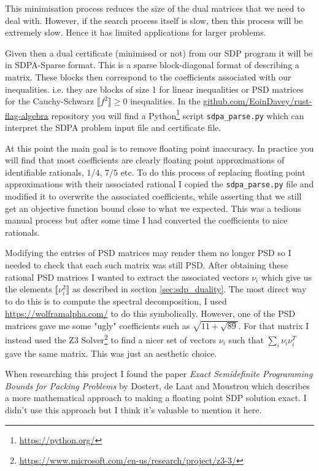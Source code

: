 This minimisation process reduces the size of the dual matrices that we need to deal with.
However, if the search process itself is slow, then this process will be extremely slow.
Hence it has limited applications for larger problems.

Given then a dual certificate (minimised or not) from our SDP program it will be in
SDPA-Sparse format. This is a sparse block-diagonal format of describing a matrix.
These blocks then correspond to the coefficients associated with our inequalities. i.e.
they are blocks of size 1 for linear inequalities or PSD matrices for the Cauchy-Schwarz
$\llbracket f^2 \rrbracket \geq 0$ inequalities. In the
\url{github.com/EoinDavey/rust-flag-algebra} repository you will find a
Python\footnote{\url{https://python.org/}} script \verb|sdpa_parse.py| which can
interpret the SDPA problem input file and certificate file.

At this point the main goal is to remove floating point inaccuracy. In practice you
will find that most coefficients are clearly floating point approximations of identifiable
rationals, $1/4$, $7/5$ etc. To do this process of replacing floating point approximations with
their associated rational I copied the \verb|sdpa_parse.py| file and modified it to
overwrite the associated coefficients, while asserting that we still get an
objective function bound close to what we expected.
This was a tedious manual process but after some time I had converted the coefficients to
nice rationals.

Modifying the entries of PSD matrices may render them no longer PSD so
I needed to check that each such matrix was still PSD. After obtaining these rational
PSD matrices I wanted to extract the associated vectors $\nu_i$ which give us the
elements $\llbracket \nu_i^2 \rrbracket$ as described in section \ref{sec:sdp_duality}.
The most direct way to do this is to compute the spectral decomposition, I used
\url{https://wolframalpha.com/} to do this symbolically. However, one of the PSD matrices
gave me some "ugly" coefficients such as $\sqrt{11 + \sqrt{89}}$. For that matrix
I instead used the Z3 Solver\footnote{\url{https://www.microsoft.com/en-us/research/project/z3-3/}}
to find a nicer set of vectors $\nu_i$ such that $\sum_i \nu_i\nu_i^T$ gave the same
matrix. This was just an aesthetic choice.

\begin{note*}
    When researching this project I found the paper
    \textit{Exact Semidefinite Programming Bounds for Packing Problems} by
    Dostert, de Laat and Moustrou \cite{dostertExactSemidefiniteProgramming2021}
    which describes a more mathematical approach to making a floating point SDP solution
    exact. I didn't use this approach but I think it's valuable to mention it here.
\end{note*}

